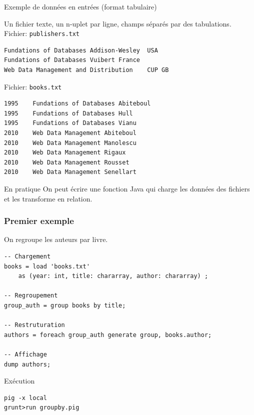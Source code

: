 \begin{frame}[fragile]{Exemple de données en entrées (format tabulaire)}

Un fichier texte, un n-uplet par ligne, champs séparés par des tabulations.
\vfill
Fichier: \texttt{publishers.txt}
\footnotesize\begin{verbatim}
Fundations of Databases	Addison-Wesley	USA
Fundations of Databases	Vuibert	France
Web Data Management and Distribution	CUP	GB
\end{verbatim}

\vfill

Fichier: \texttt{books.txt}
\footnotesize\begin{verbatim}
1995	Fundations of Databases	Abiteboul
1995	Fundations of Databases	Hull
1995	Fundations of Databases	Vianu
2010	Web Data Management	Abiteboul
2010	Web Data Management	Manolescu
2010	Web Data Management	Rigaux
2010	Web Data Management	Rousset
2010	Web Data Management	Senellart
\end{verbatim}

\begin{block}{En pratique}
On peut écrire une fonction Java qui charge les données des fichiers et les transforme
en relation.
\end{block}
\end{frame}

\begin{frame}[fragile]
\frametitle{Premier exemple}

On regroupe les auteurs par livre.

\begin{lstlisting}[language=pig]
-- Chargement
books = load 'books.txt' 
    as (year: int, title: chararray, author: chararray) ;
    
-- Regroupement    
group_auth = group books by title;

-- Restruturation
authors = foreach group_auth generate group, books.author;

-- Affichage
dump authors;
\end{lstlisting}

\begin{block}{Exécution}
\begin{verbatim}
pig -x local
grunt>run groupby.pig
\end{verbatim}
\end{block}

\end{frame}

